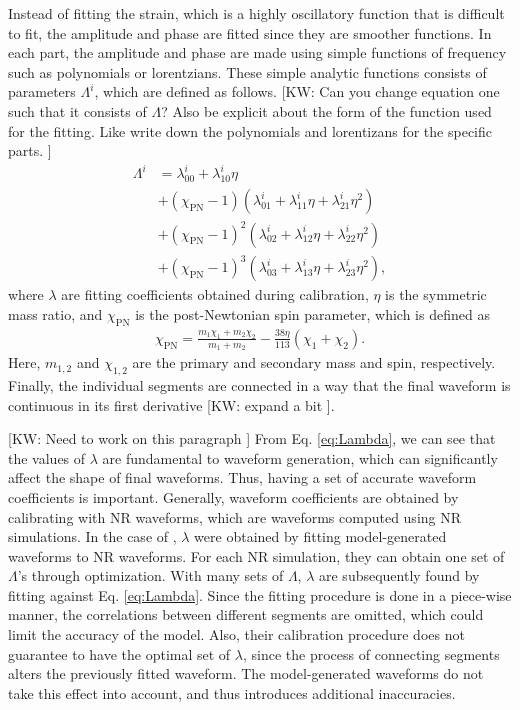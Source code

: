 \documentclass[twocolumn]{aastex631}
\newcommand{\kw}[1]{{\color{rb4}[KW: #1 ]}}
\begin{document}
Instead of fitting the strain, which is a highly oscillatory function that is
difficult to fit, the amplitude and phase are fitted since they are smoother
functions. In each part, the amplitude and phase are made using simple functions
of frequency such as polynomials or lorentzians. These simple analytic functions
consists of parameters $\Lambda^i$, which are defined as follows. \kw{Can you
change equation one such that it consists of $\Lambda$? Also be explicit about
the form of the function used for the fitting. Like write down the polynomials
and lorentizans for the specific parts.}
\begin{align} \label{eq:Lambda}
	\Lambda^i&=\lambda_{00}^i+\lambda_{10}^i\eta \nonumber \\
	&+(\chi_{\mathrm{PN}}-1)(\lambda_{01}^i+\lambda_{11}^i\eta+\lambda_{21}^i\eta^2) \nonumber \\ 
	&+(\chi_{\mathrm{PN}}-1)^2(\lambda_{02}^i+\lambda_{12}^i\eta+\lambda_{22}^i\eta^2) \nonumber \\
	&+(\chi_{\mathrm{PN}}-1)^3(\lambda_{03}^i+\lambda_{13}^i\eta+\lambda_{23}^i\eta^2),
\end{align}
where $\lambda$ are fitting coefficients obtained during calibration, $\eta$ is
the symmetric mass ratio, and $\chi_{\mathrm{PN}}$ is the post-Newtonian spin
parameter, which is defined as 
\begin{align}
	\chi_{\mathrm{PN}}=\frac{m_1\chi_1+m_2\chi_2}{m_1+m_2}-\frac{38\eta}{113}(\chi_1+\chi_2).
\end{align}
Here, $m_{1,2}$ and $\chi_{1,2}$ are the primary and secondary mass and spin,
respectively. Finally, the individual segments are connected in a way that the
final waveform is continuous in its first derivative \kw{expand a bit}.

\kw{Need to work on this paragraph}
From Eq. \ref{eq:Lambda}, we can see that the values of $\lambda$ are
fundamental to waveform generation, which can significantly affect the shape of
final waveforms. Thus, having a set of accurate waveform coefficients is
important. Generally, waveform coefficients are obtained by calibrating with NR
waveforms, which are waveforms computed using NR simulations. In the case of
\citep{khan2016frequency}, $\lambda$ were obtained by fitting model-generated
waveforms to NR waveforms. For each NR simulation, they can obtain one set of
$\Lambda$'s through optimization. With many sets of $\Lambda$, $\lambda$ are
subsequently found by fitting against Eq. \ref{eq:Lambda}. Since the fitting
procedure is done in a piece-wise manner, the correlations between different
segments are omitted, which could limit the accuracy of the model. Also,
their calibration procedure does not guarantee to have the optimal set of
$\lambda$, since the process of connecting segments alters the previously fitted
waveform. The model-generated waveforms do not take this effect into account,
and thus introduces additional inaccuracies. 
\end{document}
